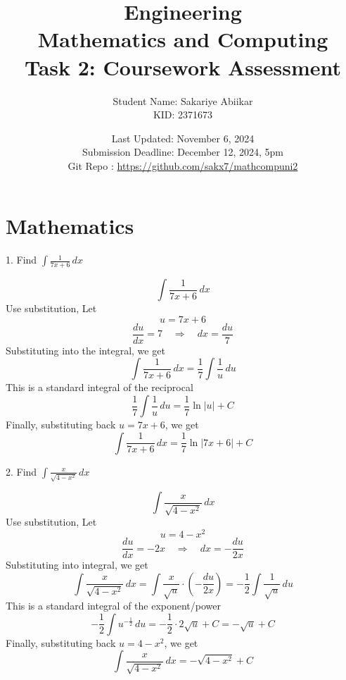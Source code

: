 \documentclass[a4paper, 12pt]{report}
\title{\vspace{3em} \Huge \textbf{Engineering\\ Mathematics and Computing}\\ \vspace{1em} \Large Task 2: Coursework Assessment}
\author{Student Name: Sakariye Abiikar\\ KID: 2371673}
\date{Last Updated: November 6, 2024\\ Submission Deadline: December 12, 2024, 5pm \\[1em] Git Repo : \color{blue}\url{https://github.com/sakx7/mathcompuni2}}
\def\ni{green!60!black!40!white}
\begin{document}
    
    \maketitle
    \thispagestyle{empty}
    
    \newpage
    \thispagestyle{empty}
    
    \chapter{Mathematics}
    
    \newpage\centering\restoregeometry
    
    \setcounter{page}{1}
    
    
    \begin{tcolorbox}[title={\color{black}\section{Q1}}, colback=white, colframe=\ni, boxrule=1mm, width=1\textwidth]
        1. Find \( \int \frac{1}{7x + 6} \, dx \)
    \end{tcolorbox}
    \[\int \frac{1}{7x + 6} \, dx\]
    Use substitution, Let 
    \[u = 7x + 6\]
    \[\frac{du}{dx} = 7 \quad \Rightarrow \quad dx = \frac{du}{7}\]
    Substituting into the integral, we get
    \[\int \frac{1}{7x + 6} \, dx = \frac{1}{7} \int \frac{1}{u} \, du\]
    This is a standard integral of the reciprocal
    \[\frac{1}{7} \int \frac{1}{u} \, du = \frac{1}{7} \ln |u| + C\]
    Finally, substituting back \( u = 7x + 6 \), we get
    \[\boxed{\int \frac{1}{7x + 6} \, dx = \frac{1}{7} \ln |7x + 6| + C}\]
    
    
    \newpage
    
    \begin{tcolorbox}[title={\color{black}\section{Q2}}, colback=white, colframe=\ni, boxrule=1mm, width=1\textwidth]
        2. Find \( \int \frac{x}{\sqrt{4 - x^2}} \, dx \)
    \end{tcolorbox}
    
    \[\int \frac{x}{\sqrt{4 - x^2}} \, dx\]
    Use substitution, Let\\[-1.5em] 
    \[u = 4 - x^2\]
    \[\frac{du}{dx} = -2x \quad \Rightarrow \quad dx = -\frac{du}{2x}\]
    Substituting into integral, we get
    \[\int \frac{x}{\sqrt{4 - x^2}} \, dx = \int \frac{x}{\sqrt{u}} \cdot \left(-\frac{du}{2x}\right) = -\frac{1}{2} \int \frac{1}{\sqrt{u}} \, du\]
    This is a standard integral of the exponent/power
    \[-\frac{1}{2} \int u^{-\frac{1}{2}} \, du = -\frac{1}{2} \cdot 2 \sqrt{u} + C = -\sqrt{u} + C\]
    Finally, substituting back \( u = 4 - x^2 \), we get
    \[\boxed{\int \frac{x}{\sqrt{4 - x^2}} \, dx = -\sqrt{4 - x^2} + C}\]
    
\end{document}
